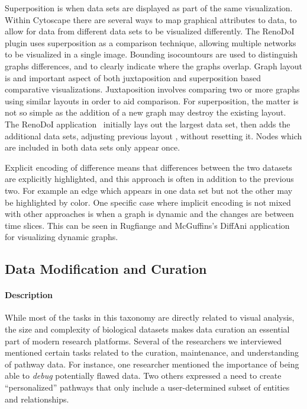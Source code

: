 \documentclass[twocolumn]{bmcart}%
\begin{document}
Superposition is when data sets are displayed as part of the same visualization.
Within Cytoscape there are several ways to map graphical attributes to data, to allow for data from different data sets to be visualized differently.
The RenoDoI plugin uses superposition as a comparison technique, allowing multiple networks to be visualized in a single image. Bounding isocountours are used to distinguish graphs differences, and to clearly indicate where the graphs overlap.
Graph layout is and important aspect of both juxtaposition and superposition based comparative visualizations.
Juxtaposition involves comparing two or more graphs using similar layouts in order to aid comparison.
For superposition, the matter is not so simple as the addition of a new graph may destroy the existing layout.
The RenoDoI application~\cite{Vehlow2015} initially lays out the largest data set, then adds the additional data sets, adjusting previous layout , without resetting it.
Nodes which are included in both data sets only appear once.

Explicit encoding of difference means that differences between the two datasets are explicitly highlighted, and this approach is often in addition to the previous two. For example an edge which appears in one data set but not the other may be highlighted by color.
One specific case where implicit encoding is not mixed with other approaches is when a graph is dynamic and the changes are between time slices.
This can be seen in Rugfiange and McGuffins's DiffAni application~\cite{Rufiange2013} for visualizing dynamic graphs.

\subsection*{Data Modification and Curation}

\paragraph*{Description}

While most of the tasks in this taxonomy are directly related to visual analysis, the size and complexity of biological datasets makes data curation an essential part of modern research platforms.
Several of the researchers we interviewed mentioned certain tasks related to the curation, maintenance, and understanding of pathway data.
For instance, one researcher mentioned the importance of being able to \emph{debug} potentially flawed data.
Two others expressed a need to create ``personalized'' pathways that only include a user-determined subset of entities and relationships.
\end{document}
